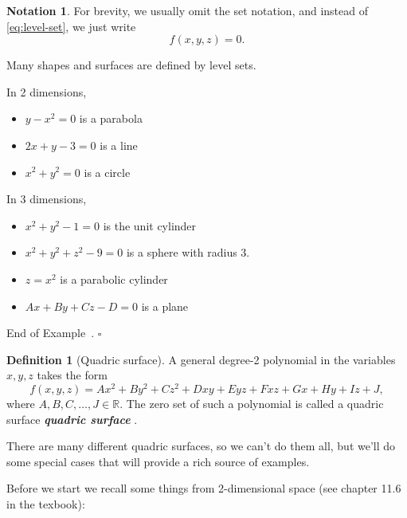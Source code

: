 \documentclass[10pt]{article}
\DeclareRobustCommand{\demph}[1]{%
  \ifmmode
  {\color{Blue}#1}%
  \else
  {\color{Blue}\bfseries\slshape #1}%
  \fi
}
\theoremstyle{definition}
\newtheorem{definition}[theorem]{Definition}
\newtheorem{example}[theorem]{Example}
\newtheorem{notation}[theorem]{Notation}
\renewenvironment{example}
{\begin{oldexample}}
  {\par\smallskip\hfill   End of Example~\theexample. $\square$    \par\end{oldexample}}
\newcommand{\1}[1]{\textbf{1}_{\left[#1\right]}} %
\def\R{\mathbb{R}} %
\begin{document}
\begin{notation}
  For brevity, we usually omit the set notation, and instead of
  \cref{eq:level-set}, we just write
  \begin{equation*}
    f(x,y,z)=0.
  \end{equation*}
\end{notation}

Many shapes and surfaces are defined by level sets.
\begin{example}
  In 2 dimensions,
  \begin{itemize}
    \item $y-x^{2}=0$ is a parabola
    \item $2x+y-3=0$ is a line
    \item $x^{2}+y^{2}=0$ is a circle
  \end{itemize}
  In 3 dimensions,
  \begin{itemize}
    \item $x^{2}+y^{2}-1=0$ is the unit cylinder
    \item $x^{2}+y^{2}+z^{2}-9=0$ is a sphere with radius 3.
    \item $z=x^{2}$ is a parabolic cylinder
    \item $Ax+By+Cz-D=0$ is a plane
  \end{itemize}
\end{example}

\begin{definition}[Quadric surface]
  \label{def:quadric-surface}
  A general degree-2 polynomial in the variables $x,y,z$ takes the form
  \begin{equation*}
    f(x,y,z) = Ax^{2}+By^{2}+Cz^{2}+Dxy+Eyz+Fxz+Gx+Hy+Iz+J,
  \end{equation*}
  where $A,B,C,\ldots,J\in \R$. The zero set of such a polynomial is called a
  \demph{quadric surface}.
\end{definition}

There are many different quadric surfaces, so we can't do them all, but we'll
do some special cases that will provide a rich source of examples.

Before we start we recall some things from 2-dimensional space (see chapter
11.6 in the texbook):
\end{document}
